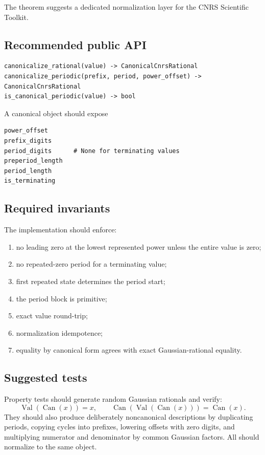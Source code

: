 \documentclass[11pt]{article}
\theoremstyle{definition}
\newcommand{\Can}{\operatorname{Can}}
\newcommand{\Value}{\operatorname{Val}}
\begin{document}
The theorem suggests a dedicated normalization layer for the CNRS Scientific Toolkit.

\subsection{Recommended public API}

\begin{verbatim}
canonicalize_rational(value) -> CanonicalCnrsRational
canonicalize_periodic(prefix, period, power_offset) -> CanonicalCnrsRational
is_canonical_periodic(value) -> bool
\end{verbatim}

A canonical object should expose
\begin{verbatim}
power_offset
prefix_digits
period_digits      # None for terminating values
preperiod_length
period_length
is_terminating
\end{verbatim}

\subsection{Required invariants}

The implementation should enforce:
\begin{enumerate}
\item no leading zero at the lowest represented power unless the entire value is zero;
\item no repeated-zero period for a terminating value;
\item first repeated state determines the period start;
\item the period block is primitive;
\item exact value round-trip;
\item normalization idempotence;
\item equality by canonical form agrees with exact Gaussian-rational equality.
\end{enumerate}

\subsection{Suggested tests}

Property tests should generate random Gaussian rationals and verify:
\[
\Value(\Can(x))=x,
\qquad
\Can(\Value(\Can(x)))=\Can(x).
\]
They should also produce deliberately noncanonical descriptions by duplicating periods, copying cycles into prefixes, lowering offsets with zero digits, and multiplying numerator and denominator by common Gaussian factors.  All should normalize to the same object.
\end{document}
